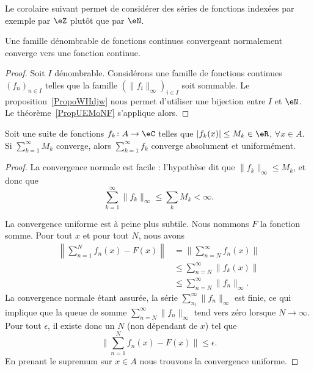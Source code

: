 Le corolaire suivant permet de considérer des séries de fonctions indexées par exemple par \( \eZ\) plutôt que par \( \eN\).
\begin{corollary}
    Une famille dénombrable de fonctions continues convergeant normalement converge vers une fonction continue.
\end{corollary}

\begin{proof}
    Soit \( I\) dénombrable. Considérons une famille de fonctions continues \( (f_n)_{n\in I}\) telles que la famille \( (\| f_i \|_{\infty})_{i\in I}\) soit sommable. Le proposition~\ref{PropoWHdjw} nous permet d'utiliser une bijection entre \( I\) et \( \eN\). Le théorème~\ref{PropUEMoNF} s'applique alors.
\end{proof}

\begin{theorem}		\label{ThoCritWeierstrass}
	Soit une suite de fonctions $f_k\colon A\to \eC$ telles que $| f_k(x) |\leq M_k\in\eR$, $\forall x\in A$. Si $\sum_{k=1}^{\infty}M_k$ converge, alors $\sum_{k=1}^{\infty}f_k$ converge absolument et uniformément.
\end{theorem}

\begin{proof}
    La convergence normale est facile : l'hypothèse dit que \( \| f_k \|_{\infty}\leq M_k\), et donc que
    \begin{equation}
        \sum_{k=1}^{\infty}\| f_k \|_{\infty}\leq \sum_kM_k<\infty.
    \end{equation}

    La convergence uniforme est à peine plus subtile. Nous nommons \( F\) la fonction somme. Pour tout \( x\) et pour tout \( N\), nous avons
    \begin{subequations}
        \begin{align}
            \left\| \sum_{n=1}^Nf_n(x)-F(x) \right\|&=\| \sum_{n=N}^{\infty}f_n(x) \|\\
            &\leq\sum_{n=N}^{\infty}\| f_k(x) \|\\
            &\leq \sum_{n=N}^{\infty}\| f_n \|_{\infty}.
        \end{align}
    \end{subequations}
    La convergence normale étant assurée, la série \( \sum_{n_1}^{\infty}\| f_n \|_{\infty}\) est finie, ce qui implique que la queue de somme \( \sum_{n=N}^{\infty}\| f_n \|_{\infty}\) tend vers zéro lorsque \( N\to \infty\). Pour tout \( \epsilon\), il existe donc un \( N\) (non dépendant de \( x\)) tel que
    \begin{equation}
        \| \sum_{n=1}^Nf_n(x)-F(x) \|\leq \epsilon.
    \end{equation}
    En prenant le supremum sur \( x\in A\) nous trouvons la convergence uniforme.
\end{proof}

